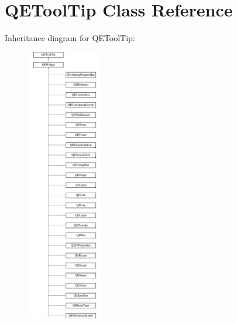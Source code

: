 \hypertarget{classQEToolTip}{
\section{QEToolTip Class Reference}
\label{classQEToolTip}
}
Inheritance diagram for QEToolTip:\begin{figure}[H]
\begin{center}
\leavevmode
\includegraphics[height=12.000000cm]{classQEToolTip}
\end{center}
\end{figure}
